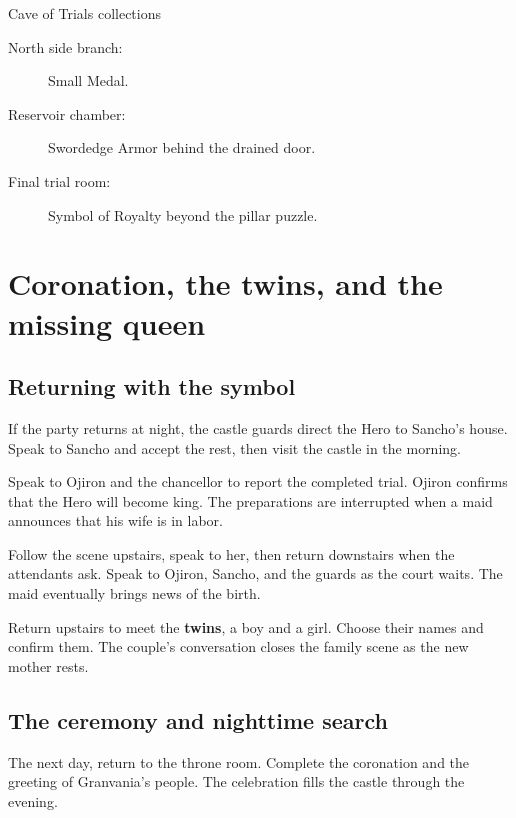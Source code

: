 \begin{routecheck}{Cave of Trials collections}
\begin{description}
  \item[North side branch:] Small Medal.
  \item[Reservoir chamber:] Swordedge Armor behind the drained door.
  \item[Final trial room:] Symbol of Royalty beyond the pillar puzzle.
\end{description}
\end{routecheck}

\section{Coronation, the twins, and the missing queen}

\subsection*{Returning with the symbol}

If the party returns at night, the castle guards direct the Hero
to Sancho's house. Speak to Sancho and accept the rest, then visit
the castle in the morning.

Speak to Ojiron and the chancellor to report the completed trial.
Ojiron confirms that the Hero will become king. The preparations
are interrupted when a maid announces that his wife is in labor.

Follow the scene upstairs, speak to her, then return downstairs
when the attendants ask. Speak to Ojiron, Sancho, and the guards
as the court waits. The maid eventually brings news of the birth.

Return upstairs to meet the \textbf{twins}, a boy and a girl.
Choose their names and confirm them. The couple's conversation
closes the family scene as the new mother rests.

\subsection*{The ceremony and nighttime search}

The next day, return to the throne room. Complete the coronation
and the greeting of Granvania's people. The celebration fills
the castle through the evening.


